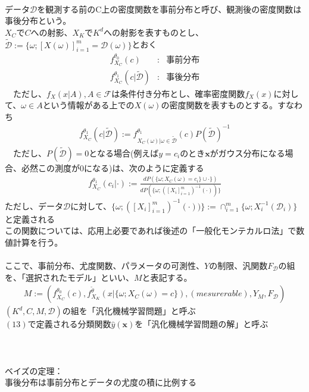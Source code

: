 \documentclass{jsarticle}
\begin{document}
 　\\
データ$\mathcal{D}$を観測する前のC上の密度関数を事前分布と呼び、観測後の密度関数は事後分布という。\\
$X_C$で$C$への射影、$X_K$で$K^d$への射影を表すものとし、$\tilde{\mathcal{D}}:=\{\omega;[X(\omega)]_{i=1}^m=\mathcal{D}(\omega)\}$とおく
\begin{eqnarray}
f^{\theta_0}_{X_C}(c)&:&事前分布\\
f^{\theta_1}_{X_C}(c|\tilde{\mathcal{D}})&:&事後分布
\end{eqnarray}
　ただし、$f_X(x|A),A\in\mathcal{F}$は条件付き分布とし、確率密度関数$f_X(x)$に対して、$\omega\in A$という情報がある上での$X(\omega)$の密度関数を表すものとする。すなわち
\begin{eqnarray}
f^{\theta_1}_{X_C}(c|\tilde{\mathcal{D}}):=f^{\theta_1}_{X_C(\omega)|\omega\in\tilde{\mathcal{D}}}(c)P(\tilde{\mathcal{D}})^{-1}
\end{eqnarray}
　ただし、$P(\tilde{\mathcal{D}})=0$となる場合(例えば$y=c_i$のとき$\bm{x}$がガウス分布になる場合、必然この測度が$0$になる)は、次のように定義する\\
\begin{eqnarray}
f^{\theta_1}_{X_C}(c_i|\cdot):=\frac{dP(\{\omega;X_C(\omega)=c_i\}\cup\cdot\})}{dP(\{\omega;([X_i]_{i=1}^m)^{-1}(\cdot))\}}
\end{eqnarray}
ただし、データ$\mathcal{D}$に対して、$\{\omega;([X_i]_{i=1}^m)^{-1}(\cdot))\}:=\cap_{i=1}^m\{\omega;X_i^{-1}(\mathcal{D}_i)\}$と定義される\\
この関数については、応用上必要であれば後述の「一般化モンテカルロ法」で数値計算を行う。
　\\
　\\
ここで、事前分布、尤度関数、パラメータの可測性、$Y$の制限、汎関数$F_\mathcal{D}$の組を、「選択されたモデル」といい、$M$と表記する。\\
\begin{eqnarray}
M:=(f^{\theta_0}_{X_C}(c),f^{\tilde{\theta}}_{X_K}(x|\{\omega;X_C(\omega)=c\}), (mesurerable),Y_M,F_\mathcal{D})
\end{eqnarray}
$(K^d,C,M,\mathcal{D})$の組を「汎化機械学習問題」と呼ぶ\\
$(13)$で定義される分類関数$\hat{y}(\bm{x})$を「汎化機械学習問題の解」と呼ぶ\\
　\\
　\\
\scalebox{1.1}{2.各種テクニック}\\
ベイズの定理：\\
事後分布は事前分布とデータの尤度の積に比例する\\
\end{document}
